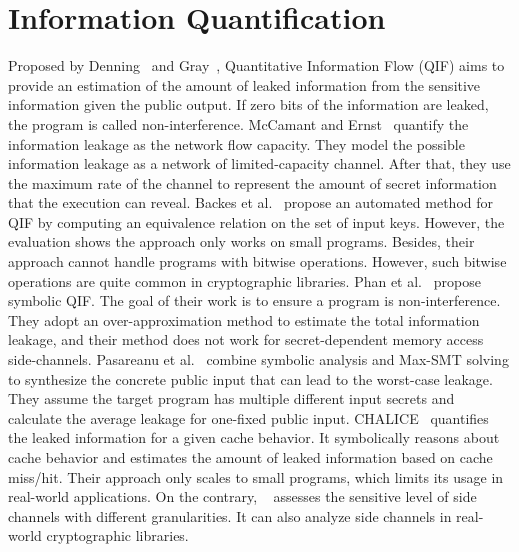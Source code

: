 \section{Information Quantification}\label{sec:qif}
Proposed by Denning~\cite{robling1982cryptography} and Gray~\cite{gray1992toward},
Quantitative Information Flow (QIF) aims to provide an estimation of the amount of leaked information from the sensitive information given the public output. If zero bits
of the information are leaked, the program is called non-interference. 
McCamant and Ernst~\cite{McCamantE2008} quantify the information leakage as the network
flow capacity. They model the possible information leakage as a network of limited-capacity
channel. After that, they use the maximum rate of the channel to represent the amount of secret information that the execution can reveal.
Backes et al.~\cite{5207642} propose an automated method for QIF
by computing an equivalence relation on the set of input keys. However,
the evaluation shows the approach only works on small programs.
Besides, their approach cannot handle programs with bitwise operations.
However, such bitwise operations are quite common in cryptographic libraries.
Phan et al.~\cite{Phan:2012:SQI:2382756.2382791} propose symbolic QIF. The goal of their
work is to ensure a program is non-interference. They adopt an over-approximation method to estimate the total information leakage, and their method
does not work for secret-dependent memory access side-channels.
Pasareanu et al.~\cite{pasareanu2016multi} combine symbolic analysis and Max-SMT solving to synthesize the concrete public input that can lead to the worst-case leakage. They assume the target program has multiple different input secrets and calculate the average leakage for one-fixed public input.
CHALICE~\cite{Chattopadhyay:2017:QIL:3127041.3127044} quantifies the leaked
information for a given cache behavior.
It symbolically reasons about cache
behavior and estimates the amount of leaked information based on cache miss/hit.
Their approach only scales to small programs, which limits its usage in
real-world applications. On the contrary, \tool{}~\cite{bao2021abacus} assesses the sensitive level
of side channels with different granularities. It can also analyze side channels in real-world cryptographic libraries.

